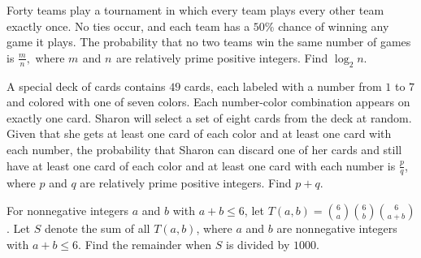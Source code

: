 \documentclass[mast]{lucky}
\begin{document}
    \begin{req}[AIME 1999/13]{4}
Forty teams play a tournament in which every team plays every other team exactly once. No ties occur, and each team has a $50 \%$ chance of winning any game it plays. The probability that no two teams win the same number of games is $\frac mn,$ where $m_{}$ and $n_{}$ are relatively prime positive integers. Find $\log_2 n.$
\end{req}
    
    \begin{prob}[AIME II 2017/9]{4}
A special deck of cards contains $49$ cards, each labeled with a number from $1$ to $7$ and colored with one of seven colors. Each number-color combination appears on exactly one card. Sharon will select a set of eight cards from the deck at random. Given that she gets at least one card of each color and at least one card with each number, the probability that Sharon can discard one of her cards and still have at least one card of each color and at least one card with each number is $\frac{p}{q}$, where $p$ and $q$ are relatively prime positive integers. Find $p+q$.
\end{prob}
    
    \begin{prob}[AIME I 2017/7]{6}
For nonnegative integers $a$ and $b$ with $a + b \leq 6$, let $T(a, b) = \binom{6}{a} \binom{6}{b} \binom{6}{a + b}$. Let $S$ denote the sum of all $T(a, b)$, where $a$ and $b$ are nonnegative integers with $a + b \leq 6$. Find the remainder when $S$ is divided by $1000$.
\end{prob}
    
\end{document}
